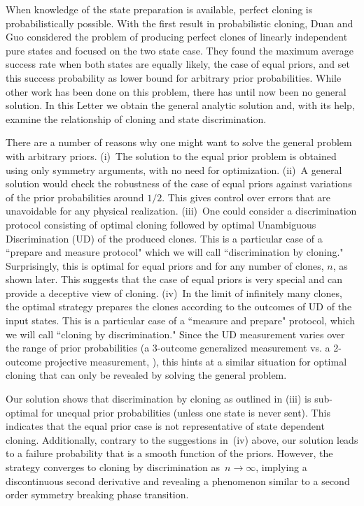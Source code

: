 \documentclass[aps,prl,twocolumn,showpacs]{revtex4}
\begin{document}
When knowledge of the state preparation is available, perfect cloning is probabilistically possible. With the first result in probabilistic cloning, Duan and Guo \cite{DuanGuo} considered the problem of producing perfect clones of linearly independent pure states and focused on the two state case.  They found the maximum average success rate when both states are equally likely, the case of equal priors, and set this success probability as {\color{red}lower} bound for arbitrary prior probabilities.  While other work has been done on this problem, there has until now been no general solution. In this Letter we obtain the general analytic solution and, with its help, examine the relationship of cloning and state discrimination.
 
There are a number of reasons why one might want to solve the general problem with arbitrary priors.  (i)~The solution to the equal prior problem is obtained using only symmetry arguments, with no need for optimization. (ii)~A general solution would check the robustness of the case of equal priors against variations of the prior probabilities around $1/2$.  This gives control over errors that are unavoidable for any physical realization. (iii)~One could consider a discrimination protocol consisting of optimal cloning followed by optimal Unambiguous Discrimination (UD) of the produced clones. This is a particular case of a ``prepare and measure protocol" which we will call ``discrimination by cloning." Surprisingly, this is optimal for equal priors and for any number of clones, $n$, as shown later.  This suggests that the case of equal priors is very special and can provide a deceptive view of cloning.  (iv)~In the limit of infinitely many clones, the optimal strategy prepares the clones according to the outcomes of UD of the input states. This is a particular case of a ``measure and prepare" protocol, which we will call ``cloning by discrimination." Since the UD measurement varies over the range of prior probabilities (a 3-outcome generalized measurement vs. a 2-outcome projective measurement, \cite{Bergou}), this hints at a similar situation for optimal cloning that can only be revealed by solving the general problem. 

Our solution shows that discrimination by cloning as outlined in (iii) is sub-optimal for unequal prior probabilities (unless one state is never sent). This indicates that the equal prior case is not representative of state dependent cloning.  Additionally, contrary to the suggestions in~(iv) above, our solution leads to a failure probability that is a smooth function of the priors. However,  the strategy converges to cloning by discrimination as~$n\to\infty$, implying a discontinuous second derivative and revealing a phenomenon similar to a second order symmetry breaking phase transition.
\end{document}
